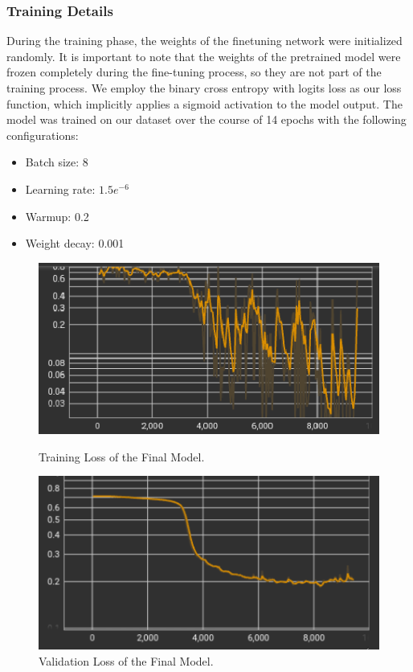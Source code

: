 \documentclass[12pt,oneside,bibtotoc,liststotoc]{scrbook}
\begin{document}
\subsubsection{Training Details}
During the training phase, the weights of the finetuning network were initialized randomly. It is important to note that the weights of the pretrained model were frozen completely during the fine-tuning process, so they are not part of the training process. We employ the binary cross entropy with logits loss as our loss function, which implicitly applies a sigmoid activation to the model output. The model was trained on our dataset over the course of 14 epochs with the following configurations:
\begin{itemize}
  \item Batch size: 8
  \item Learning rate: $1.5e^{-6}$
  \item Warmup: 0.2
  \item Weight decay: 0.001
\end{itemize}
\begin{figure}[h]
  \begin{minipage}[b]{0.49\textwidth}
    \centering
    \includegraphics[width=\textwidth]{img/final_model_train_loss.png}
    \caption{Training Loss of the Final Model.}
    \label{fig:final_train_loss}
  \end{minipage}
  \hfill
  \begin{minipage}[b]{0.49\textwidth}
    \centering
    \includegraphics[width=\textwidth]{img/final_model_val_loss.png}
    \caption{Validation Loss of the Final Model.}
    \label{fig:final_valid_loss}
  \end{minipage}
\end{figure}
\end{document}
